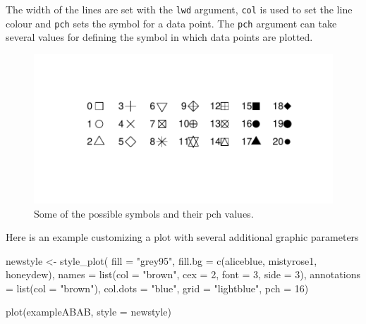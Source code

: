 \documentclass[
  letterpaper,
  DIV=11,
  numbers=noendperiod]{scrreprt}
\newenvironment{Shaded}{\begin{snugshade}}{\end{snugshade}}
\newcommand{\AttributeTok}[1]{\textcolor[rgb]{0.40,0.45,0.13}{#1}}
\newcommand{\DecValTok}[1]{\textcolor[rgb]{0.68,0.00,0.00}{#1}}
\newcommand{\FunctionTok}[1]{\textcolor[rgb]{0.28,0.35,0.67}{#1}}
\newcommand{\NormalTok}[1]{\textcolor[rgb]{0.00,0.23,0.31}{#1}}
\newcommand{\OtherTok}[1]{\textcolor[rgb]{0.00,0.23,0.31}{#1}}
\newcommand{\StringTok}[1]{\textcolor[rgb]{0.13,0.47,0.30}{#1}}
\begin{document}
The width of the lines are set with the \texttt{lwd} argument,
\texttt{col} is used to set the line colour and \texttt{pch} sets the
symbol for a data point. The \texttt{pch} argument can take several
values for defining the symbol in which data points are plotted.

\begin{figure}

{\centering \includegraphics{./ch_creating_a_plot_files/figure-pdf/symbols, pch-1.pdf}

}

\caption{Some of the possible symbols and their pch values.}

\end{figure}

Here is an example customizing a plot with several additional graphic
parameters

\begin{Shaded}
\begin{Highlighting}[]
\NormalTok{newstyle }\OtherTok{\textless{}{-}} \FunctionTok{style\_plot}\NormalTok{(}
  \AttributeTok{fill =} \StringTok{"grey95"}\NormalTok{,}
  \AttributeTok{fill.bg =} \FunctionTok{c}\NormalTok{(}\StringTok{\textquotesingle{}aliceblue\textquotesingle{}}\NormalTok{, }\StringTok{\textquotesingle{}mistyrose1\textquotesingle{}}\NormalTok{, }\StringTok{\textquotesingle{}honeydew\textquotesingle{}}\NormalTok{),}
  \AttributeTok{names =} \FunctionTok{list}\NormalTok{(}\AttributeTok{col =} \StringTok{"brown"}\NormalTok{, }\AttributeTok{cex =} \DecValTok{2}\NormalTok{, }\AttributeTok{font =} \DecValTok{3}\NormalTok{, }\AttributeTok{side =} \DecValTok{3}\NormalTok{),}
  \AttributeTok{annotations =} \FunctionTok{list}\NormalTok{(}\AttributeTok{col =} \StringTok{"brown"}\NormalTok{),}
  \AttributeTok{col.dots =} \StringTok{"blue"}\NormalTok{,}
  \AttributeTok{grid =} \StringTok{"lightblue"}\NormalTok{, }
  \AttributeTok{pch =} \DecValTok{16}\NormalTok{)}

\FunctionTok{plot}\NormalTok{(exampleABAB, }\AttributeTok{style =}\NormalTok{ newstyle)}
\end{Highlighting}
\end{Shaded}
\end{document}
